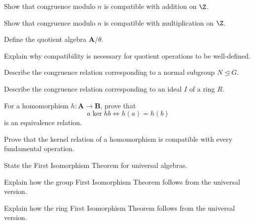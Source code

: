 \begin{exercise}[2]
Show that congruence modulo \(n\) is compatible with addition on \(\Z\).
\end{exercise}

\begin{exercise}[2]
Show that congruence modulo \(n\) is compatible with multiplication on
\(\Z\).
\end{exercise}

\begin{exercise}[1]
Define the quotient algebra \(\mathbf A/\theta\).
\end{exercise}

\begin{exercise}[2]
Explain why compatibility is necessary for quotient operations to be
well-defined.
\end{exercise}

\begin{exercise}[2]
Describe the congruence relation corresponding to a normal subgroup
\(N\trianglelefteq G\).
\end{exercise}

\begin{exercise}[2]
Describe the congruence relation corresponding to an ideal \(I\) of a ring
\(R\).
\end{exercise}

\begin{exercise}[2]
For a homomorphism \(h:\mathbf A\to\mathbf B\), prove that
\[ a\mathrel{\ker h}b\iff h(a)=h(b) \]
is an equivalence relation.
\end{exercise}

\begin{exercise}[3]
Prove that the kernel relation of a homomorphism is compatible with every
fundamental operation.
\end{exercise}

\begin{exercise}[2]
State the First Isomorphism Theorem for universal algebras.
\end{exercise}

\begin{exercise}[2]
Explain how the group First Isomorphism Theorem follows from the universal
version.
\end{exercise}

\begin{exercise}[2]
Explain how the ring First Isomorphism Theorem follows from the universal
version.
\end{exercise}

